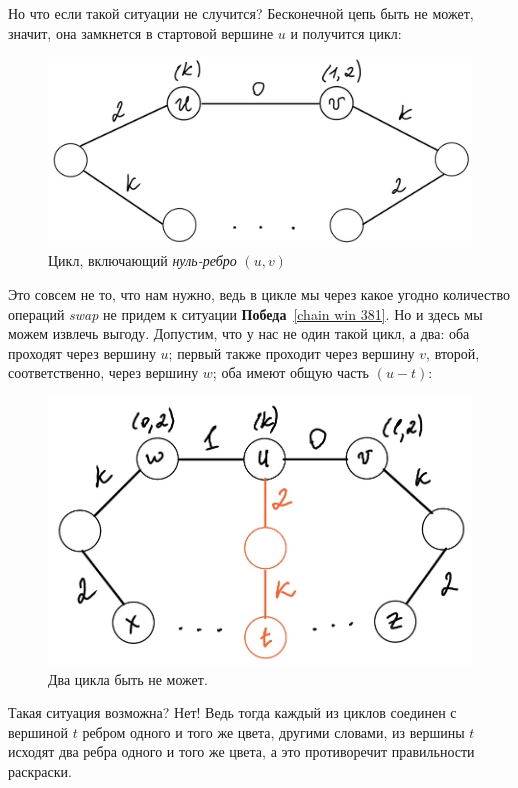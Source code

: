 Но что если такой ситуации не случится? Бесконечной цепь быть не может, значит, она замкнется в стартовой вершине \(u\) и получится цикл:
\begin{figure}[H]
    \centering
    \includegraphics[scale=0.3]{Fall/img/solution-381_cycle.jpg}
    \caption{Цикл, включающий \emph{нуль-ребро} \((u, v)\)} \label{cycle 381}
\end{figure}

Это совсем не то, что нам нужно, ведь в цикле мы через какое угодно количество операций \emph{swap} не придем к ситуации \textbf{Победа}~\eqref{chain win 381}. Но и здесь мы можем извлечь выгоду. Допустим, что у нас не один такой цикл, а два: оба проходят через вершину \(u\); первый также проходит через вершину \(v\), второй, соответственно, через вершину \(w\); оба имеют общую часть \((u-t)\):
\begin{figure}[H]
    \centering
    \includegraphics[scale=0.3]{Fall/img/solution-381_two_cycles.jpg}
    \caption{Два цикла быть не может.} \label{two cycles 381}
\end{figure}

Такая ситуация возможна? Нет! Ведь тогда каждый из циклов соединен с вершиной \(t\) ребром одного и того же цвета, другими словами, из вершины \(t\) исходят два ребра одного и того же цвета, а это противоречит правильности раскраски.

